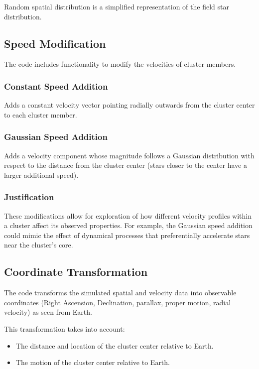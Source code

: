\documentclass{article}
\begin{document}
	Random spatial distribution is a simplified representation of the field star distribution. 
	
	\subsection{Speed Modification}
	
	The code includes functionality to modify the velocities of cluster members. 
	
	\subsubsection{Constant Speed Addition}
	
	Adds a constant velocity vector pointing radially outwards from the cluster center to each cluster member. 
	
	\subsubsection{Gaussian Speed Addition}
	
	Adds a velocity component whose magnitude follows a Gaussian distribution with respect to the distance from the cluster center (stars closer to the center have a larger additional speed).
	
	\subsubsection{Justification}
	
	These modifications allow for exploration of how different velocity profiles within a cluster affect its observed properties. For example, the Gaussian speed addition could mimic the effect of dynamical processes that preferentially accelerate stars near the cluster's core.
	
	\subsection{Coordinate Transformation}
	
	The code transforms the simulated spatial and velocity data into observable coordinates (Right Ascension, Declination, parallax, proper motion, radial velocity) as seen from Earth. 
	
	This transformation takes into account:
	
	\begin{itemize}
		\item The distance and location of the cluster center relative to Earth. 
		\item The motion of the cluster center relative to Earth. 
	\end{itemize}
	
\end{document}
